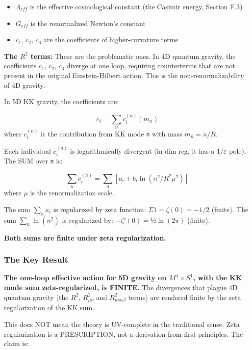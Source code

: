 \documentclass[aps,prd,preprint,superscriptaddress,longbibliography,floatfix]{revtex4-2}
\theoremstyle{remark}
\begin{document}
\begin{itemize}
  \item $\Lambda_{eff}$ is the effective cosmological constant (the Casimir energy, Section F.3)
  \item $G_{eff}$ is the renormalized Newton's constant
  \item $c_{1}$, $c_{2}$, $c_{3}$ are the coefficients of higher-curvature terms
\end{itemize}

\textbf{The $R^{2}$ terms:} These are the problematic ones. In 4D quantum gravity, the coefficients $c_{1}$, $c_{2}$, $c_{3}$ diverge at one loop, requiring counterterms that are not present in the original Einstein-Hilbert action. This is the non-renormalizability of 4D gravity.

In 5D KK gravity, the coefficients are:


\begin{equation}
    c_{i} = \sum_n c_{i}^{(n)}(m_n)
\end{equation}
where $c_{i}^{(n)}$ is the contribution from KK mode \texttt{n} with mass $m_{n} = n/R$.

Each individual $c_{i}^{(n)}$ is logarithmically divergent (in dim reg, it has a $1/\varepsilon$ pole). The SUM over \texttt{n} is:


\begin{equation}
    \sum_n c_{i}^{(n)} = \sum_n [a_{i} + b_{i} \ln(n^{2}/R^{2}\mu^{2})]
\end{equation}
where $\mu$ is the renormalization scale.

The sum $\sum_n a_{i}$ is regularized by zeta function: $\Sigma 1 = \zeta(0) = -1/2$ (finite). The sum $\sum_n \ln(n^{2})$ is regularized by: $-\zeta'(0) = $½$ \ln(2\pi)$ (finite).

\textbf{Both sums are finite under zeta regularization.}


\subsubsection{The Key Result}

\textbf{The one-loop effective action for 5D gravity on $M^{4} \times S^{1}$, with the KK mode sum zeta-regularized, is FINITE.} The divergences that plague 4D quantum gravity (the $R^{2}$, $R_{\mu\nu}^{2}$ and $R_{\mu\nu\alpha\beta}^{2}$ terms) are rendered finite by the zeta regularization of the KK sum.

This does NOT mean the theory is UV-complete in the traditional sense. Zeta regularization is a PRESCRIPTION, not a derivation from first principles. The claim is:
\end{document}
